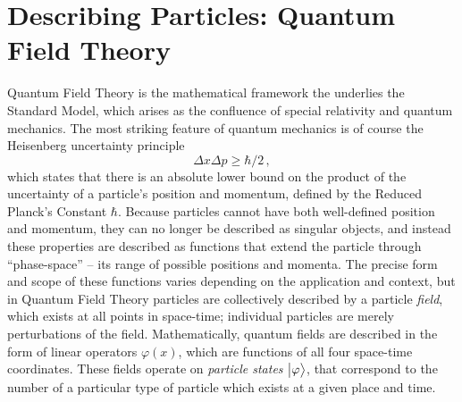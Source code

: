 \section{Describing Particles: Quantum Field Theory}

    Quantum Field Theory is the mathematical framework the underlies the Standard Model,
        which arises as the confluence of special relativity and quantum mechanics.
    The most striking feature of quantum mechanics is of course the Heisenberg uncertainty principle
        \begin{equation}
            \Delta x \Delta p \geq \hbar/2 \,,
        \end{equation}
        which states that there is an absolute lower bound on the
        product of the uncertainty of a particle's position and momentum,
        defined by the Reduced Planck's Constant $\hbar$.
    Because particles cannot have both well-defined position and momentum,
        they can no longer be described as singular objects,
        and instead these properties are described as functions that extend the particle through 
        ``phase-space'' -- its range of possible positions and momenta.
    The precise form and scope of these functions varies depending on the application and context,
        but in Quantum Field Theory particles are collectively described by a particle \textit{field},
        which exists at all points in space-time;
        individual particles are merely perturbations of the field.
    Mathematically, quantum fields are described in the form of linear operators $\varphi(x)$,
        which are functions of all four space-time coordinates.
    These fields operate on \textit{particle states} $\big| \varphi \big>$,
        that correspond to the number of a particular type of particle which exists at a given place and time.

